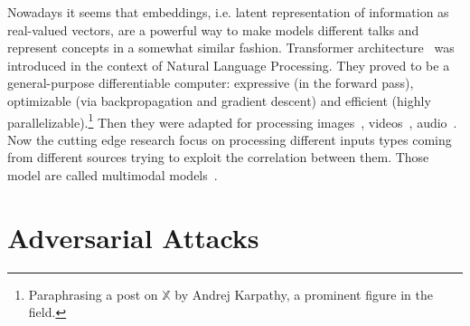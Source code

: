 Nowadays it seems that embeddings, i.e. latent representation of information as
real-valued vectors, are a powerful way to make models different talks and
represent concepts in a somewhat similar fashion. Transformer
architecture~\cite{AttentionIsAlVaswan2017} was introduced in the context of
Natural Language Processing. They proved to be a general-purpose differentiable
computer: expressive (in the forward pass), optimizable (via backpropagation
and gradient descent) and efficient (highly
parallelizable).\footnote{Paraphrasing a post on $\mathbb{X}$ by Andrej
Karpathy, a prominent figure in the field.} Then they were adapted for
processing images~\cite{ImageTransformParmar2018, EndToEndObjeCarion2020,
AnImageIsWorDosovi2020}, videos~\cite{VivitAVideoArnab2021,
TemporalContexShao2020}, audio~\cite{NeuralSpeechSLiNa2018,
SpeechTransforDong2018, ConformerConvGulati2020}. Now the cutting edge research
focus on processing different inputs types coming from different sources trying
to exploit the correlation between them. Those model are called multimodal
models~\cite{ASurveyOnMulYinS2023}.


\section{Adversarial Attacks}
\label{sec:adversarial-attacks-related-work}

